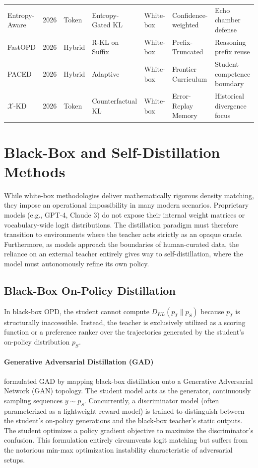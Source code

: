 \documentclass{article} %
\begin{document}
\begin{table}[tbp]
{\begin{tabular}{@{}lclllll@{}}
        Entropy-Aware \citep{2603.07079}  & 2026 & Token  & Entropy-Gated KL    & White-box & Confidence-weighted  & Echo chamber defense \\
        FastOPD \citep{2602.15260}        & 2026 & Hybrid & R-KL on Suffix      & White-box & Prefix-Truncated     & Reasoning prefix reuse \\
        PACED \citep{2603.11178}          & 2026 & Hybrid & Adaptive            & White-box & Frontier Curriculum  & Student competence boundary \\
        $\mathcal{X}$-KD \citep{2602.12674} & 2026 & Token & Counterfactual KL  & White-box & Error-Replay Memory  & Historical divergence focus \\
        \bottomrule
    \end{tabular}
    }
\end{table}

\section{Black-Box and Self-Distillation Methods}
\label{sec:black_box}

While white-box methodologies deliver mathematically rigorous density matching, they impose an operational impossibility in many modern scenarios. Proprietary models (e.g., GPT-4, Claude 3) do not expose their internal weight matrices or vocabulary-wide logit distributions. The distillation paradigm must therefore transition to environments where the teacher acts strictly as an opaque oracle. Furthermore, as models approach the boundaries of human-curated data, the reliance on an external teacher entirely gives way to self-distillation, where the model must autonomously refine its own policy.

\subsection{Black-Box On-Policy Distillation}
\label{subsec:black_box}

In black-box OPD, the student cannot compute $D_{KL}(p_T \parallel p_S)$ because $p_T$ is structurally inaccessible. Instead, the teacher is exclusively utilized as a scoring function or a preference ranker over the trajectories generated by the student's on-policy distribution $p_S$.

\paragraph{Generative Adversarial Distillation (GAD)}
\citet{2511.10643} formulated GAD by mapping black-box distillation onto a Generative Adversarial Network (GAN) topology. The student model acts as the generator, continuously sampling sequences $y \sim p_S$. Concurrently, a discriminator model (often parameterized as a lightweight reward model) is trained to distinguish between the student's on-policy generations and the black-box teacher's static outputs. The student optimizes a policy gradient objective to maximize the discriminator's confusion. This formulation entirely circumvents logit matching but suffers from the notorious min-max optimization instability characteristic of adversarial setups.
\end{document}
